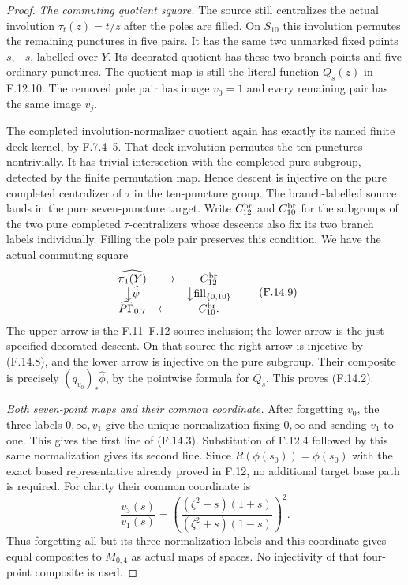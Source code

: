 \begin{proof}
\emph{The commuting quotient square.}
The source still centralizes the actual involution
$\tau_t(z)=t/z$ after the poles are filled.
On $S_{10}$ this involution permutes the remaining
punctures in five pairs.  It has the same two
unmarked fixed points $s,-s$, labelled over $Y$.
Its decorated quotient has these two branch
points and five ordinary punctures.
The quotient map is still the literal function
$Q_s(z)$ in F.12.10.  The removed pole pair has
image $v_0=1$ and every remaining pair has the
same image $v_j$.

The completed involution-normalizer quotient again
has exactly its named finite deck kernel, by
F.7.4--5.  That deck involution permutes the ten
punctures nontrivially.  It has trivial intersection
with the completed pure subgroup, detected by
the finite permutation map.  Hence descent is
injective on the pure completed centralizer of
$\tau$ in the ten-puncture group.
The branch-labelled source lands in the pure
seven-puncture target.  Write $C^{\rm br}_{12}$
and $C^{\rm br}_{10}$ for the subgroups of the
two pure completed $\tau$-centralizers whose
descents also fix its two branch labels
individually.  Filling the pole pair preserves
this condition.
We have the actual commuting square
\[
\begin{array}{ccc}
 \widehat{\pi_1(Y)}
   &\longrightarrow&C^{\rm br}_{12}\\
 \big\downarrow\widehat\psi
   &&\big\downarrow\mathrm{fill}_{\{0,10\}}\\
 \widehat{P\Gamma}_{0,7}
   &\longleftarrow&C^{\rm br}_{10}.
\end{array}                                                     \tag{F.14.9}
\]
The upper arrow is the F.11--F.12 source inclusion;
the lower arrow is the just specified decorated
descent.  On that source the right arrow is
injective by (F.14.8), and the lower arrow is
injective on the pure subgroup.  Their composite
is precisely $(q_{v_0})_*\widehat\phi$, by the
pointwise formula for $Q_s$.  This proves
(F.14.2).

\emph{Both seven-point maps and their common coordinate.}
After forgetting $v_0$, the three labels $0,\infty,v_1$
give the unique normalization fixing $0,\infty$
and sending $v_1$ to one.  This gives the first
line of (F.14.3).
Substitution of F.12.4 followed by this same
normalization gives its second line.
Since $R(\phi(s_0))=\phi(s_0)$ with the exact
based representative already proved in F.12,
no additional target base path is required.
For clarity their common coordinate is
\[
 \frac{v_3(s)}{v_1(s)}
   =\left(
       \frac{(\zeta^2-s)(1+s)}
            {(\zeta^2+s)(1-s)}
     \right)^2 .
                                                               \tag{F.14.10}
\]
Thus forgetting all but its three normalization
labels and this coordinate gives equal composites
to $M_{0,4}$ as actual maps of spaces.
No injectivity of that four-point composite is used.


\end{proof}
